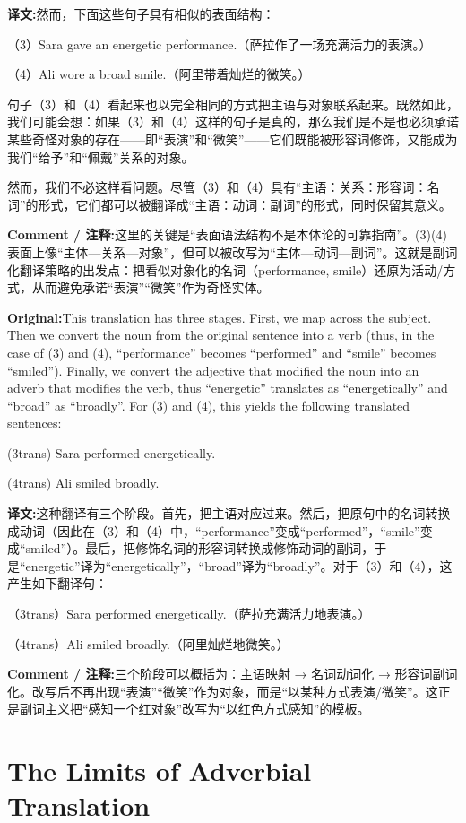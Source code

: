 \documentclass[11pt,a4paper]{article}
\newcommand{\eng}[1]{\begin{engbox}\noindent\textbf{Original:}\quad #1\end{engbox}}
\newcommand{\cn}[1]{\begin{cnbox}\noindent\textbf{译文:}\quad #1\end{cnbox}}
\newcommand{\cmt}[1]{\begin{commentbox}\noindent\textbf{Comment / 注释:}\quad #1\end{commentbox}}
\begin{document}
\cn{然而，下面这些句子具有相似的表面结构：

（3）Sara gave an energetic performance.（萨拉作了一场充满活力的表演。）

（4）Ali wore a broad smile.（阿里带着灿烂的微笑。）

句子（3）和（4）看起来也以完全相同的方式把主语与对象联系起来。既然如此，我们可能会想：如果（3）和（4）这样的句子是真的，那么我们是不是也必须承诺某些奇怪对象的存在——即“表演”和“微笑”——它们既能被形容词修饰，又能成为我们“给予”和“佩戴”关系的对象。

然而，我们不必这样看问题。尽管（3）和（4）具有“主语：关系：形容词：名词”的形式，它们都可以被翻译成“主语：动词：副词”的形式，同时保留其意义。}

\cmt{这里的关键是“表面语法结构不是本体论的可靠指南”。(3)(4) 表面上像“主体—关系—对象”，但可以被改写为“主体—动词—副词”。这就是副词化翻译策略的出发点：把看似对象化的名词（performance, smile）还原为活动/方式，从而避免承诺“表演”“微笑”作为奇怪实体。}

\eng{This translation has three stages. First, we map across the subject. Then we convert the noun from the original sentence into a verb (thus, in the case of (3) and (4), “performance” becomes “performed” and “smile” becomes “smiled”). Finally, we convert the adjective that modified the noun into an adverb that modifies the verb, thus “energetic” translates as “energetically” and “broad” as “broadly”. For (3) and (4), this yields the following translated sentences:

(3trans) Sara performed energetically.

(4trans) Ali smiled broadly.}

\cn{这种翻译有三个阶段。首先，把主语对应过来。然后，把原句中的名词转换成动词（因此在（3）和（4）中，“performance”变成“performed”，“smile”变成“smiled”）。最后，把修饰名词的形容词转换成修饰动词的副词，于是“energetic”译为“energetically”，“broad”译为“broadly”。对于（3）和（4），这产生如下翻译句：

（3trans）Sara performed energetically.（萨拉充满活力地表演。）

（4trans）Ali smiled broadly.（阿里灿烂地微笑。）}

\cmt{三个阶段可以概括为：主语映射 → 名词动词化 → 形容词副词化。改写后不再出现“表演”“微笑”作为对象，而是“以某种方式表演/微笑”。这正是副词主义把“感知一个红对象”改写为“以红色方式感知”的模板。}

\section{The Limits of Adverbial Translation}
\end{document}
